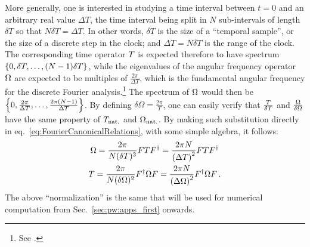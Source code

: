 
More generally, one is interested in studying a time interval
between $t=0$ and an arbitrary real value $\Delta{T}$,
the time interval being split in $N$ sub-intervals of length $\delta{T}$
so that $N\delta{T} = \Delta{T}$.
In other words, $\delta T$
is the size of a ``temporal sample'', or the size of a discrete
step in the clock;
and $\Delta T = N\delta T$ is the range of the clock.
The corresponding time operator ${T}$
is expected therefore to have spectrum $\left\{0, \delta{T}, \dots, (N-1)\delta{T}\right\}$,
while the eigenvalues of the angular frequency operator ${\Omega}$
are expected to be multiples of
$\frac{2\pi}{\Delta{T}}$, which is
the fundamental
angular frequency for the discrete Fourier analysis.\footnote{
  See
  \cite[chapters
    ``The Discrete Fourier Transform'' and
    ``Fourier Analysis of Signals Using the Discrete Fourier Transform'']{Oppenheim:Int1,Oppenheim:Int3}.
}
The spectrum of ${\Omega}$ would then be $\left\{0, \frac{2\pi}{\Delta{T}}, \dots, \frac{2\pi(N-1)}{\Delta{T}}\right\}$.
By defining $\delta{\Omega} = \frac{2\pi}{T}$,
one can easily verify that $\frac{{T}}{\delta{T}}$ and $\frac{{\Omega}}{\delta{\Omega}}$
have the same property of ${T}_{\mathrm{nat.}}$ and ${\Omega}_{\mathrm{nat.}}$.  
By making such substitution directly in eq.~\eqref{eq:FourierCanonicalRelations},
with some simple algebra, it follows:
\begin{gather}
  \label{eq:SI_Fourier:Omega}
    {\Omega} = \frac{2\pi}{N(\delta T)^2} F {T} F^{\dagger} = \frac{2\pi N}{\qty(\Delta T)^2} F {T} F^{\dagger} \\
  \label{eq:SI_Fourier:T}
    {T} = \frac{2\pi}{N(\delta\Omega)^2} F^{\dagger} {\Omega} F = \frac{2\pi N}{\qty(\Delta\Omega)^2} F^{\dagger} {\Omega} F
  \, \text{.}
\end{gather}
The above ``normalization'' is the same that will be used
for numerical computation from Sec.~\ref{sec:pw:apps_first} onwards.



